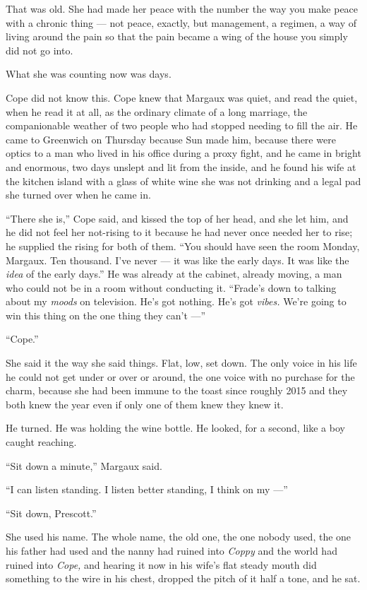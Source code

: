 \documentclass[11pt,openany]{book}
\begin{document}
That was old. She had made her peace with the number the way you make peace with a chronic thing --- not peace, exactly, but management, a regimen, a way of living around the pain so that the pain became a wing of the house you simply did not go into.

What she was counting now was days.

Cope did not know this. Cope knew that Margaux was quiet, and read the quiet, when he read it at all, as the ordinary climate of a long marriage, the companionable weather of two people who had stopped needing to fill the air. He came to Greenwich on Thursday because Sun made him, because there were optics to a man who lived in his office during a proxy fight, and he came in bright and enormous, two days unslept and lit from the inside, and he found his wife at the kitchen island with a glass of white wine she was not drinking and a legal pad she turned over when he came in.

``There she is,'' Cope said, and kissed the top of her head, and she let him, and he did not feel her not-rising to it because he had never once needed her to rise; he supplied the rising for both of them. ``You should have seen the room Monday, Margaux. Ten thousand. I've never --- it was like the early days. It was like the \textit{idea} of the early days.'' He was already at the cabinet, already moving, a man who could not be in a room without conducting it. ``Frade's down to talking about my \textit{moods} on television. He's got nothing. He's got \textit{vibes.} We're going to win this thing on the one thing they can't ---''

``Cope.''

She said it the way she said things. Flat, low, set down. The only voice in his life he could not get under or over or around, the one voice with no purchase for the charm, because she had been immune to the toast since roughly 2015 and they both knew the year even if only one of them knew they knew it.

He turned. He was holding the wine bottle. He looked, for a second, like a boy caught reaching.

``Sit down a minute,'' Margaux said.

``I can listen standing. I listen better standing, I think on my ---''

``Sit down, Prescott.''

She used his name. The whole name, the old one, the one nobody used, the one his father had used and the nanny had ruined into \textit{Coppy} and the world had ruined into \textit{Cope,} and hearing it now in his wife's flat steady mouth did something to the wire in his chest, dropped the pitch of it half a tone, and he sat.
\end{document}
